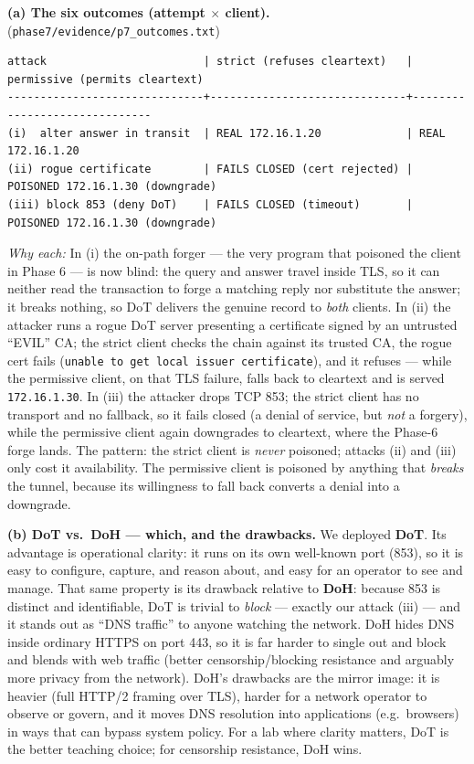 \documentclass[11pt,a4paper]{article}
\begin{document}
\textbf{(a) The six outcomes (attempt $\times$ client).}
(\texttt{phase7/evidence/p7\_outcomes.txt})
\begin{lstlisting}
attack                        | strict (refuses cleartext)   | permissive (permits cleartext)
------------------------------+------------------------------+------------------------------
(i)  alter answer in transit  | REAL 172.16.1.20             | REAL 172.16.1.20
(ii) rogue certificate        | FAILS CLOSED (cert rejected) | POISONED 172.16.1.30 (downgrade)
(iii) block 853 (deny DoT)    | FAILS CLOSED (timeout)       | POISONED 172.16.1.30 (downgrade)
\end{lstlisting}
\emph{Why each:} In (i) the on-path forger --- the very program that poisoned the client in Phase 6
--- is now blind: the query and answer travel inside TLS, so it can neither read the transaction to
forge a matching reply nor substitute the answer; it breaks nothing, so DoT delivers the genuine
record to \emph{both} clients. In (ii) the attacker runs a rogue DoT server presenting a certificate
signed by an untrusted ``EVIL'' CA; the strict client checks the chain against its trusted CA, the
rogue cert fails (\texttt{unable to get local issuer certificate}), and it refuses --- while the
permissive client, on that TLS failure, falls back to cleartext and is served
\texttt{172.16.1.30}. In (iii) the attacker drops TCP 853; the strict client has no transport and no
fallback, so it fails closed (a denial of service, but \emph{not} a forgery), while the permissive
client again downgrades to cleartext, where the Phase-6 forge lands. The pattern: the strict client
is \emph{never} poisoned; attacks (ii) and (iii) only cost it availability. The permissive client is
poisoned by anything that \emph{breaks} the tunnel, because its willingness to fall back converts a
denial into a downgrade.

\textbf{(b) DoT vs.\ DoH --- which, and the drawbacks.} We deployed \textbf{DoT}. Its advantage is
operational clarity: it runs on its own well-known port (853), so it is easy to configure, capture,
and reason about, and easy for an operator to see and manage. That same property is its drawback
relative to \textbf{DoH}: because 853 is distinct and identifiable, DoT is trivial to \emph{block} ---
exactly our attack (iii) --- and it stands out as ``DNS traffic'' to anyone watching the network.
DoH hides DNS inside ordinary HTTPS on port 443, so it is far harder to single out and block and
blends with web traffic (better censorship/blocking resistance and arguably more privacy from the
network). DoH's drawbacks are the mirror image: it is heavier (full HTTP/2 framing over TLS),
harder for a network operator to observe or govern, and it moves DNS resolution into applications
(e.g.\ browsers) in ways that can bypass system policy. For a lab where clarity matters, DoT is the
better teaching choice; for censorship resistance, DoH wins.
\end{document}
